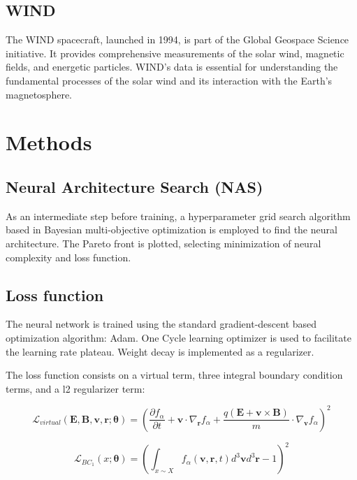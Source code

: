 \documentclass[12pt]{article}
\begin{document}
\subsection{WIND}
The WIND spacecraft, launched in 1994, is part of the Global Geospace Science initiative. It provides comprehensive measurements of the solar wind, magnetic fields, and energetic particles. WIND's data is essential for understanding the fundamental processes of the solar wind and its interaction with the Earth's magnetosphere.

\section{Methods}

\subsection{Neural Architecture Search (NAS)}
As an intermediate step before training, a hyperparameter grid search algorithm based in Bayesian multi-objective optimization is employed to find the neural architecture. The Pareto front is plotted, selecting minimization of neural complexity and loss function.

\subsection{Loss function}
The neural network is trained using the standard gradient-descent based optimization algorithm: Adam. One Cycle learning optimizer is used to facilitate the learning rate plateau. Weight decay is implemented as a regularizer.

The loss function consists on a virtual term, three integral boundary condition terms, and a l2 regularizer term:

\begin{equation}
    \mathcal{L}_{virtual}\left(\mathbf{E}, \mathbf{B}, \mathbf{v}, \mathbf{r}; \mathbf{\theta}\right) = \left(\frac{\partial f_{\alpha}}{\partial t} + \mathbf{v} \cdot \nabla_{\mathbf{r}}  f_{\alpha} + \frac{q (\mathbf{E} + \mathbf{v} \times \mathbf{B})}{m} \cdot \nabla_{\mathbf{v}} f_\alpha \right)^2
\end{equation}

\begin{equation}
    \mathcal{L}_{BC_1} \left(x; \mathbf{\theta}\right) = \left(\int_{x \sim X} f_\alpha (\mathbf{v}, \mathbf{r}, t) d^3\mathbf{v} d^3\mathbf{r} - 1\right)^2
\end{equation}
\end{document}
